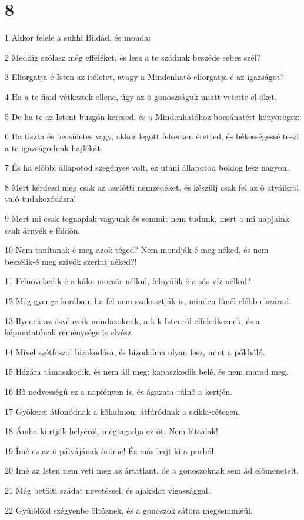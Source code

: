 \chapter{8}

\par 1 Akkor felele a sukhi Bildád, és monda:
\par 2 Meddig szólasz még efféléket, és lesz a te szádnak beszéde sebes szél?
\par 3 Elforgatja-é Isten az ítéletet, avagy a Mindenható elforgatja-é az igazságot?
\par 4 Ha a te fiaid vétkeztek ellene, úgy az õ gonoszságuk miatt vetette el õket.
\par 5 De ha te az Istent buzgón keresed, és a Mindenhatóhoz bocsánatért könyörögsz;
\par 6 Ha tiszta és becsületes vagy, akkor legott felserken éretted, és békességessé teszi a te igazságodnak hajlékát.
\par 7 És ha elõbbi állapotod szegényes volt, ez utáni állapotod boldog lesz nagyon.
\par 8 Mert kérdezd meg csak az azelõtti nemzedéket, és készülj csak fel az õ atyáikról való tudakozódásra!
\par 9 Mert mi csak tegnapiak vagyunk és semmit nem tudunk, mert a mi napjaink csak árnyék e földön.
\par 10 Nem tanítanak-é meg azok téged? Nem mondják-é meg néked, és nem beszélik-é meg szívök szerint néked?!
\par 11 Felnövekedik-é a káka mocsár nélkül, felnyúlik-é a sás víz nélkül?
\par 12 Még gyenge korában, ha fel nem szakasztják is, minden fûnél elébb elszárad.
\par 13 Ilyenek az ösvényeik mindazoknak, a kik Istenrõl elfeledkeznek, és a képmutatónak reménysége is elvész.
\par 14 Mivel szétfoszol bizakodása, és bizodalma olyan lesz, mint a pókháló.
\par 15 Házára támaszkodik, és nem áll meg; kapaszkodik belé, és nem marad meg.
\par 16 Bõ nedvességû ez a napfényen is, és ágazata túlnõ a kertjén.
\par 17 Gyökerei átfonódnak a kõhalmon; átfúródnak a szikla-rétegen.
\par 18 Ámha kiirtják helyérõl, megtagadja ez õt: Nem láttalak!
\par 19 Ímé ez az õ pályájának öröme! És más hajt ki a porból.
\par 20 Ímé az Isten nem veti meg az ártatlant, de a gonoszoknak sem ád elõmenetelt.
\par 21 Még betölti szádat nevetéssel, és ajakidat vigassággal.
\par 22 Gyûlölõid szégyenbe öltöznek, és a gonoszok sátora megsemmisül.

